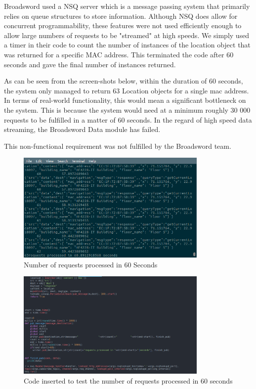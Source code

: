 \documentclass{article}
\begin{document}
\begin{flushleft}
Broadsword used a NSQ server which is a message passing system that primarily relies on queue structures to store information. Although NSQ does allow for concurrent programmability, these features were not used efficiently enough to allow large numbers of requests to be "streamed" at high speeds. We simply used a timer in their code to count the number of instances of the location object that was returned for a specific MAC address. This terminated the code after 60 seconds and gave the final number of instances returned.   
\end{flushleft}

\begin{flushleft}
As can be seen from the screen-shots below, within the duration of 60 seconds, the system only managed to return 63 Location objects for a single mac address. In terms of real-world functionality, this would mean a significant bottleneck on the system. This is because the system would need at a minimum roughly 30 000 requests to be fulfilled in a matter of 60 seconds. In the regard of high speed data streaming, the Broadsword Data module has failed.
\end{flushleft}

\begin{flushleft}
This non-functional requirement was not fulfilled by the Broadsword team.
\end{flushleft}

\begin{figure}[ht]
  \includegraphics[width=350px]{Images/RequestsSent.png}
  \caption{Number of requests processed in 60 Seconds}
  \label{Number of Requests}
\end{figure}

\begin{figure}[ht]
  \includegraphics[width=350px]{Images/timer.png}
  \caption{Code inserted to test the number of requests processed in 60 seconds}
  \label{Testing Code}

\end{figure}
\end{document}
